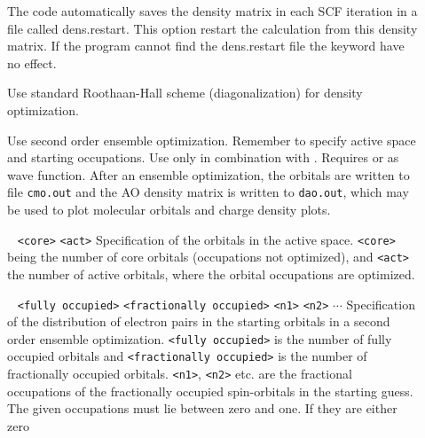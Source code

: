 \begin{description}
\item[] The code automatically saves the density matrix in each SCF iteration in a file called dens.restart. This option restart the calculation from this density matrix. If the program cannot find the dens.restart file the keyword have no effect. 
\item[] Use standard Roothaan-Hall scheme (diagonalization) for density optimization.
\item[]
Use second order ensemble optimization. Remember to specify active space and starting occupations. Use only in combination with . 
Requires  or  as wave function. After an ensemble optimization, the orbitals are written to file \verb|cmo.out| and the AO 
density matrix is written to \verb|dao.out|, which may be used to plot molecular orbitals and charge density plots.
\item[] \verb| | \newline
\verb|<core>| \verb|<act>|\newline
Specification of the orbitals in the active space. \verb|<core>| being the number of core orbitals (occupations not optimized), and \verb|<act>| the number 
of active orbitals, where the orbital occupations are optimized.
\item[] \verb| | \newline
\verb|<fully occupied>|\newline 
\verb|<fractionally occupied>|\newline
\verb|<n1>| \verb|<n2>| $\cdots$ \newline
Specification of the distribution of electron pairs in the starting orbitals in a second order ensemble optimization. \verb|<fully occupied>| is the number of 
fully occupied orbitals and \verb|<fractionally occupied>| is the number of fractionally occupied orbitals. \verb|<n1>|, \verb|<n2>| etc. are the fractional 
occupations of the fractionally occupied spin-orbitals in the starting guess. The given occupations must lie between zero and one. If they are either zero 

\end{description}
